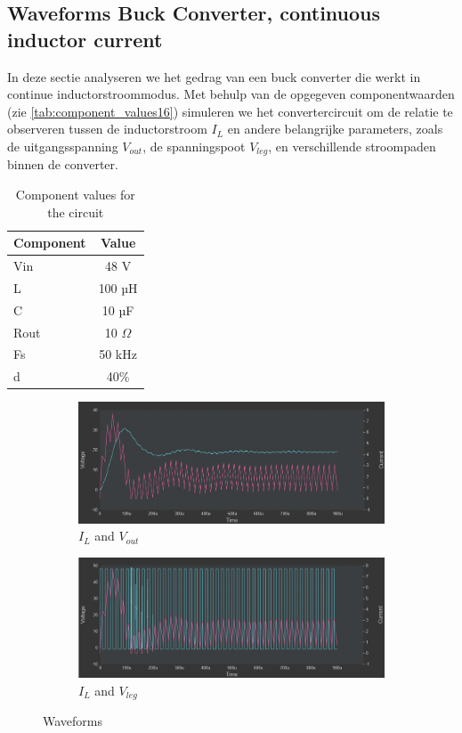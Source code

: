 \subsection{Waveforms Buck Converter, continuous inductor current}\label{2.6}
In deze sectie analyseren we het gedrag van een buck converter die werkt in continue inductorstroommodus. Met behulp van de opgegeven componentwaarden (zie \autoref{tab:component_values16}) simuleren we het convertercircuit om de relatie te observeren tussen de inductorstroom \( I_L \) en andere belangrijke parameters, zoals de uitgangsspanning \( V_{out} \), de spanningspoot \( V_{leg} \), en verschillende stroompaden binnen de converter.

\begin{table}[h!]
\centering
\begin{tabular}{|l|c|}
\hline
\textbf{Component} & \textbf{Value} \\ \hline
Vin & 48 V \\ \hline
L & 100 µH \\ \hline
C & 10 µF \\ \hline
Rout & 10 \(\Omega\) \\ \hline
Fs & 50 kHz \\ \hline
d & 40\% \\ \hline
\end{tabular}
\caption{Component values for the circuit}
\label{tab:component_values16}
\end{table}
\begin{figure}[h!]
    \centering
    \begin{subfigure}[b]{0.5\linewidth}
        \centering
        \includegraphics[width=\linewidth]{img/hfd2/IL-Vout.png}
        \caption{\(I_{L}\) and \(V_{out}\)}
        \label{fig:Waveform_IL_Vout}
    \end{subfigure}
    \hfill
    \begin{subfigure}[b]{0.5\linewidth}
        \centering
        \includegraphics[width=\linewidth]{img/hfd2/IL-Vleg.png}
        \caption{\(I_{L}\) and \(V_{leg}\)}
        \label{fig:Waveform_IL_VLeg}
    \end{subfigure}
    \caption{Waveforms}
    \label{fig:Waveforms}
\end{figure}

